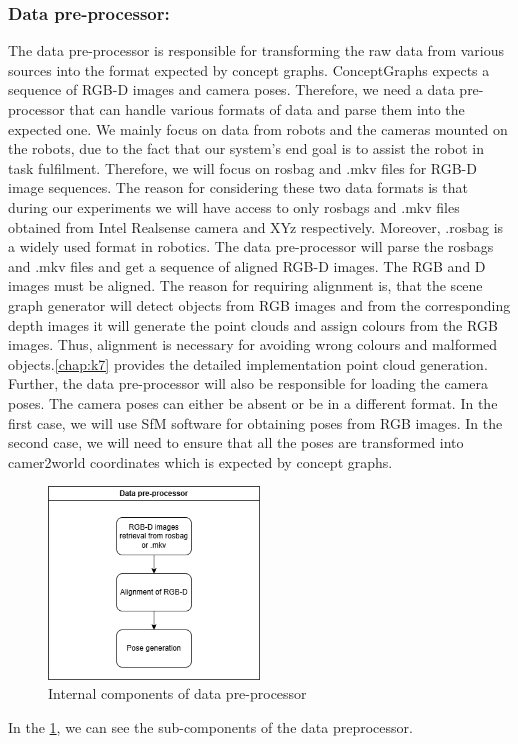 \subsubsection{Data pre-processor:}
The data pre-processor is responsible for transforming the raw data from various sources into the format expected by concept graphs. 
ConceptGraphs expects a sequence of RGB-D images and camera poses. Therefore, we need a data pre-processor that can handle various formats of data
and parse them into the expected one.  We mainly focus on data from robots and the cameras mounted on the robots, due to the fact that our system's end goal 
is to assist the robot in task fulfilment. 
Therefore, we will focus on rosbag and .mkv files for RGB-D image sequences. The reason for considering these two data formats is that during our experiments
we will have access to only rosbags and .mkv files obtained from Intel Realsense camera and XYz respectively. Moreover, .rosbag is a widely used format in robotics.
The data pre-processor will parse the rosbags and .mkv files  and get a sequence of aligned RGB-D images. 
The RGB and D images must be aligned. The reason for requiring alignment is, that the scene graph 
generator will detect objects from RGB images and from the corresponding depth images it will generate the point clouds and assign colours from 
the RGB images. Thus, alignment is necessary for avoiding wrong colours and malformed objects.\cref{chap:k7} provides the detailed 
implementation point cloud generation. 
Further, the data pre-processor will also be responsible for loading the camera poses. The camera poses can either be absent or be in 
a different format. In the first case, we will use SfM software for obtaining poses from RGB images. In the second case, we will need to
ensure that all the poses are transformed into camer2world coordinates which is expected by concept graphs.
\begin{figure}[ht!]
    \centering
    \includegraphics[width=0.5\textwidth]{content/images/DataPreProcessorDesign.png}
    \caption{Internal components of data pre-processor}
    \label{fig:dataPreprocessor}
\end{figure}
In the \cref{fig:dataPreprocessor}, we can see the sub-components of the data preprocessor.

